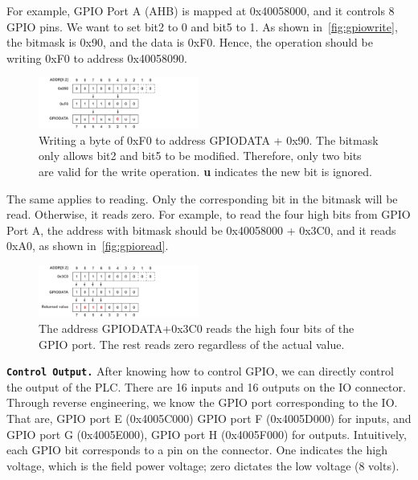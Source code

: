 For example, GPIO Port A (AHB) is mapped at 0x40058000, and it controls 8 GPIO pins. We want to set bit2 to 0 and bit5 to 1. As shown in~\autoref{fig:gpiowrite}, the bitmask is 0x90, and the data is 0xF0.  Hence, the operation should be writing 0xF0 to address 0x40058090.


\begin{figure}[th]
	\includegraphics[width=0.47\textwidth]{figures/gpiowrite2}
	\centering
	\caption{Writing a byte of 0xF0 to address GPIODATA + 0x90.  The bitmask only allows bit2 and bit5 to be modified. Therefore, only two bits are valid for the write operation.  \textbf{u} indicates the new bit is ignored.}
	\label{fig:gpiowrite}
\end{figure}



The same applies to reading. Only the corresponding bit in the bitmask will be read. Otherwise, it reads zero. For example, to read the four high bits from GPIO Port A, the address with bitmask should be 0x40058000 + 0x3C0, and it reads 0xA0, as shown in~\autoref{fig:gpioread}.

\begin{figure}[th]
	\includegraphics[width=0.47\textwidth]{figures/gpioread2}
	\centering
	\caption{The address GPIODATA+0x3C0 reads the high four bits of the GPIO port. The rest reads zero regardless of the actual value.}
	\label{fig:gpioread}
\end{figure}



\textbf{\texttt{Control Output.}} After knowing how to control GPIO, we can directly control the output of the PLC. There are 16 inputs and 16 outputs on the IO connector. Through reverse engineering, we know the GPIO port corresponding to the IO.  That are, GPIO port E (0x4005C000) GPIO port F (0x4005D000) for inputs, and GPIO port G (0x4005E000), GPIO port H (0x4005F000) for outputs. Intuitively, each GPIO bit corresponds to a pin on the connector. One indicates the high voltage, which is the field power voltage; zero dictates the low voltage (8 volts).

